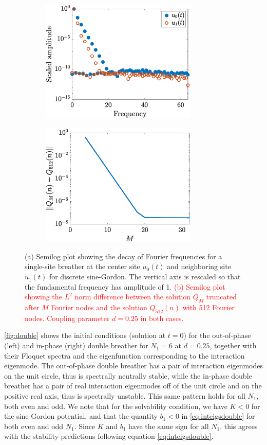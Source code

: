 \documentclass[12pt,reqno]{amsart}
\theoremstyle{definition}
\newcommand{\revised}[1]{ \textcolor{red}{#1} }
\begin{document}
\begin{figure}
	\begin{center}
	\begin{subfigure}{0.45\linewidth}
		\caption{}
		\includegraphics[width=7.5cm]{freqdecay.eps}
		\label{fig:freqdecaya}
	\end{subfigure}
	\begin{subfigure}{0.45\linewidth}
		\caption{}
		\includegraphics[width=7.5cm]{truncdecay.eps}
		\label{fig:freqdecayb}
	\end{subfigure}
	\end{center}
	\caption{(a) Semilog plot showing the decay of Fourier frequencies for a single-site breather at the center site $u_0(t)$ and neighboring site $u_1(t)$ for discrete sine-Gordon. The vertical axis is rescaled so that the fundamental frequency has amplitude of 1. 
	\revised{(b) Semilog plot showing the $L^2$ norm difference between the solution $Q_M$ truncated after $M$ Fourier nodes and the solution $Q_{512}(n)$ with 512 Fourier nodes. Coupling parameter $d=0.25$ in both cases.}
	}
	\label{fig:freqdecay}
\end{figure}

\cref{fig:double} shows the initial conditions (solution at $t=0$) for the out-of-phase (left) and in-phase (right) double breather for $N_1 = 6$ at $d = 0.25$, together with their Floquet spectra and the eigenfunction corresponding to the interaction eigenmode. The out-of-phase double breather has a pair of interaction eigenmodes on the unit circle, thus is spectrally neutrally stable, while the in-phase double breather has a pair of real interaction eigenmodes off of the unit circle and on the positive real axis, thus is spectrally unstable. This same pattern holds for all $N_1$, both even and odd. We note that for the solvability condition, we have $K < 0$ for the sine-Gordon potential, and that the quantity $b_1 < 0$ in \cref{eq:inteigsdouble} for both even and odd $N_1$. Since $K$ and $b_1$ have the same sign for all $N_1$, this agrees with the stability predictions following equation \cref{eq:inteigsdouble}.
\end{document}
